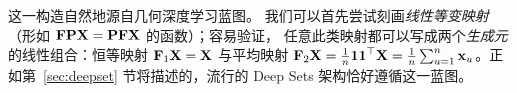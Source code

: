

这一构造自然地源自几何深度学习蓝图。
我们可以首先尝试刻画{\em 线性等变映射}（形如 $\mathbf{F} {\bf P X} = \bf{P} \mathbf{FX}$ 的函数）；容易验证，
任意此类映射都可以写成两个\emph{生成元}的线性组合：恒等映射 $\mathbf{F}_1 \mathbf{X} = {\bf X}$ 与平均映射 ${\mathbf{F}_2 \mathbf{X}}= \frac{1}{n}\boldsymbol{1}\boldsymbol{1}^\top \mathbf{X} = \frac{1}{n} \sum_{u=1}^n {\bf x}_u$。正如第~\ref{sec:deepset} 节将描述的，流行的 Deep Sets \citep{zaheer2017deep} 架构恰好遵循这一蓝图。




